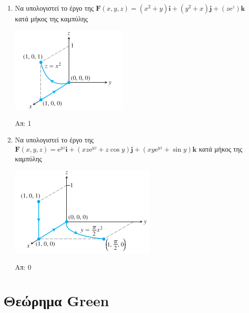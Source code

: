 \begin{enumerate}
  \item Να υπολογιστεί το έργο της $ \mathbf{F}(x,y,z) = (x^{2}+y) \mathbf{i} +
    (y^{2}+x) \mathbf{j} + (z \mathrm{e}^{z}) \mathbf{k} $ κατά μήκος της καμπύλης

    \includegraphics[scale=0.5]{int4.png}

    \hfill Απ: 1 

  \item Να υπολογιστεί το έργο της $ \mathbf{F}(x,y,z) = \mathrm{e}^{yz} \mathbf{i} +
    (xz \mathrm{e}^{yz} + z \cos{y}) \mathbf{j} + (xy \mathrm{e}^{yz} + \sin{y}) \mathbf{k} $ κατά μήκος της καμπύλης

    \includegraphics[scale=0.5]{int3.png}

    \hfill Απ: 0 
\end{enumerate}


\section*{Θεώρημα Green}


